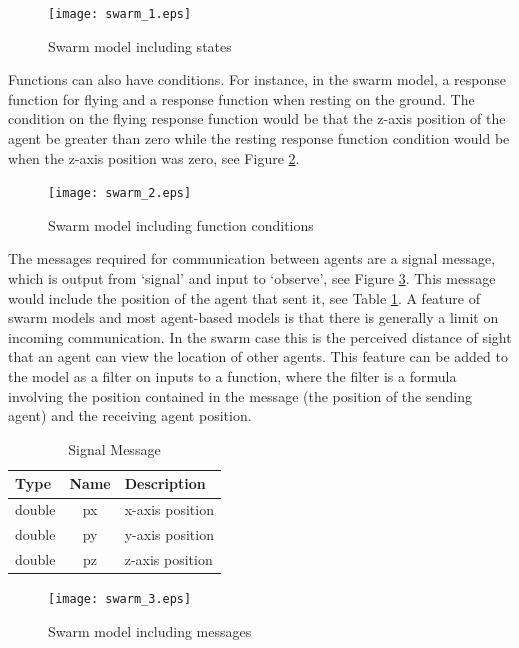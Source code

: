 \begin{figure}[ht]
\begin{center}
\texttt{[image: swarm\_1.eps]}
\caption{Swarm model including states}
\label{fig:swarm_1}
\end{center}
\end{figure}

Functions can also have conditions. For instance, in
the swarm model, a response function for flying and a response function when
resting on the ground. The condition on the flying response function would be that the
z-axis position of the agent be greater than zero while the resting response
function condition would be when the z-axis position was zero, see Figure
\ref{fig:swarm_2}.

\begin{figure}[ht]
\begin{center}
\texttt{[image: swarm\_2.eps]}
\caption{Swarm model including function conditions}
\label{fig:swarm_2}
\end{center}
\end{figure}

The messages required for communication between agents are a signal message,
which is output from `signal' and input to `observe', see Figure
\ref{fig:swarm_3}. This message would include the position of the agent that
sent it, see Table \ref{tab:signal_message}. A feature of swarm models and most
agent-based models is that there is generally a limit on incoming communication. 
In the swarm case this is the perceived distance of sight that an agent can view the location of other
agents. This feature can be added to the model as a filter on inputs to a
function, where the filter is a formula involving the position contained in the
message (the position of the sending agent) and the receiving agent position.

\begin{table}[ht]
\centering
\begin{tabular}{|l||c||l|}
\hline
Type&Name&Description\\
\hline \hline
double&px&x-axis position\\
\hline
double&py&y-axis position\\
\hline
double&pz&z-axis position\\
\hline
\end{tabular}
\caption{Signal Message}
\label{tab:signal_message}
\end{table}

\begin{figure}[ht]
\begin{center}
\texttt{[image: swarm\_3.eps]}
\caption{Swarm model including messages}
\label{fig:swarm_3}
\end{center}
\end{figure}

